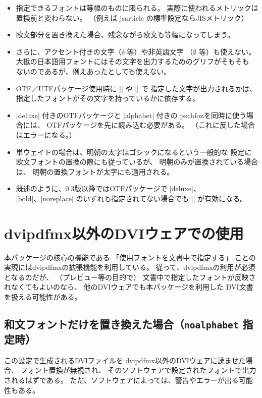 \documentclass[a4paper,uplatex]{jsarticle}
\newcommand{\Pkg}[1]{\textsf{#1}}
\begin{document}
\begin{itemize}
\item 指定できるフォントは等幅のものに限られる。
  実際に使われるメトリックは置換前と変わらない。
  （例えば jsarticle の標準設定ならJISメトリック）
\item 欧文部分を置き換えた場合、残念ながら欧文も等幅になってしまう。
\item さらに、アクセント付きの文字（\'e 等）や非英語文字
  （{\ss} 等）も使えない。
  大抵の日本語用フォントにはその文字を出力するためのグリフがそもそも
  ないのであるが、例えあったとしても使えない。
\item \Pkg{OTF}／\Pkg{UTF}パッケージ使用時に |\UTF| や |\CID| で
  指定した文字が出力されるかは、
  指定したフォントがその文字を持っているかに依存する。
\item |deluxe| 付きの\Pkg{OTF}パッケージと |alphabet| 付きの
  \Pkg{pxchfon}を同時に使う場合には、
  \Pkg{OTF}パッケージを先に読み込む必要がある。
  （これに反した場合はエラーになる。）
\item 単ウェイトの場合は、明朝の太字はゴシックになるという一般的な
  設定に欧文フォントの置換の際にも従っているが、
  明朝のみが置換されている場合は、
  明朝の置換フォントが太字にも適用される。
\item 既述のように、0.3版以降では\Pkg{OTF}パッケージで |deluxe|、
  |bold|、|noreplace| のいずれも指定されてない場合でも |\setgothicfont|
  が有効になる。
\end{itemize}

\appendix
\section{dvipdfmx以外のDVIウェアでの使用}

本パッケージの核心の機能である
「使用フォントを文書中で指定する」
ことの実現にはdvipdfmxの拡張機能を利用している。
従って、dvipdfmxの利用が必須となるのだが、
（プレビュー等の目的で）
文書中で指定したフォントが反映されなくてもよいのなら、
他のDVIウェアでも本パッケージを利用した
DVI文書を扱える可能性がある。

\subsection{和文フォントだけを置き換えた場合（\texttt{noalphabet} 指定時）}

この設定で生成されるDVIファイルを
dvipdfmx以外のDVIウェアに読ませた場合、
フォント置換が無視され、
そのソフトウェアで設定されたフォントで出力されるはずである。
ただ、ソフトウェアによっては、警告やエラーが出る可能性もある。
\end{document}
